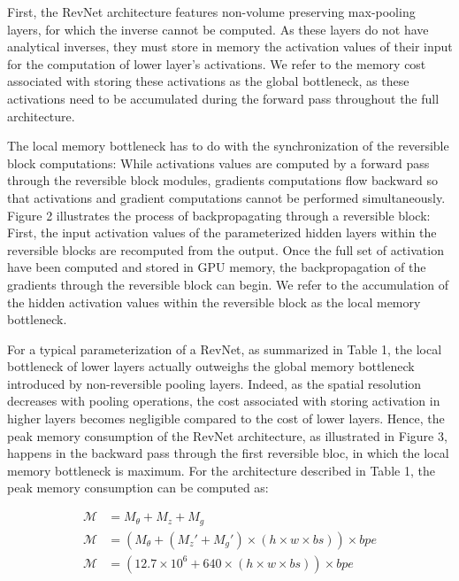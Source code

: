 \documentclass[twocolumn]{bmcart}
\begin{document}
First, the RevNet architecture features non-volume preserving max-pooling layers, for which the inverse cannot be computed.
As these layers do not have analytical inverses, they must store in memory the activation values of their input for the computation of lower layer's activations. 
We refer to the memory cost associated with storing these activations as the global bottleneck, as these activations need to be accumulated during the forward pass throughout the full architecture.

The local memory bottleneck has to do with the synchronization of the reversible block computations:
While activations values are computed by a forward pass through the reversible block modules,
gradients computations flow backward so that activations and gradient computations cannot be performed simultaneously.
Figure 2 illustrates the process of backpropagating through a reversible block:
First, the input activation values of the parameterized hidden layers within the reversible blocks are recomputed from the output.
Once the full set of activation have been computed and stored in GPU memory, the backpropagation of the gradients through the reversible block can begin.
We refer to the accumulation of the hidden activation values within the reversible block as the local memory bottleneck.

For a typical parameterization of a RevNet, as summarized in Table 1, the local bottleneck of lower layers actually outweighs the global memory bottleneck introduced by non-reversible pooling layers.
Indeed, as the spatial resolution decreases with pooling operations, the cost associated with storing activation in higher layers becomes negligible compared to the cost of lower layers.
Hence, the peak memory consumption of the RevNet architecture, as illustrated in Figure 3, happens in the backward pass through the first reversible bloc,
in which the local memory bottleneck is maximum.
For the architecture described in Table 1, the peak memory consumption can be computed as:

\begin{subequations}
\begin{align}
\mathcal{M} &= M_{\theta} + M_{z} + M_{g} \\
\mathcal{M} &= (M_{\theta} + (M_z' + M_{g}') \times (h \times w \times bs)) \times bpe \\
\mathcal{M} &= (12.7 \times 10^6 + 640 \times (h \times w \times bs)) \times bpe \\
\end{align}
\end{subequations}
\end{document}
